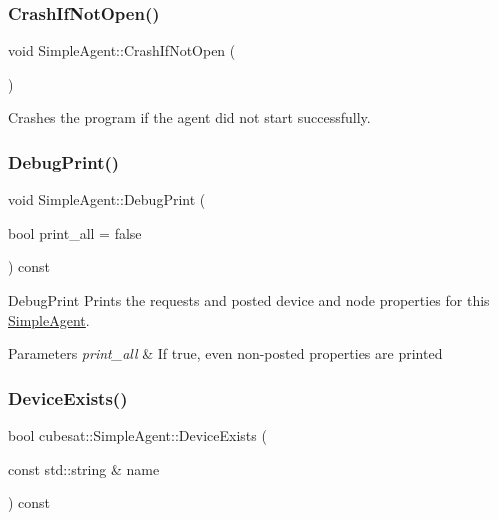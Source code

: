 \subsubsection{\texorpdfstring{Crash\+If\+Not\+Open()}{CrashIfNotOpen()}}
{\footnotesize\ttfamily void Simple\+Agent\+::\+Crash\+If\+Not\+Open (\begin{DoxyParamCaption}{ }\end{DoxyParamCaption})}



Crashes the program if the agent did not start successfully. 

\mbox{\label{classcubesat_1_1SimpleAgent_af5c2133bcbb45de986a69343c13ed513}} 
\subsubsection{\texorpdfstring{Debug\+Print()}{DebugPrint()}}
{\footnotesize\ttfamily void Simple\+Agent\+::\+Debug\+Print (\begin{DoxyParamCaption}\item[{bool}]{print\+\_\+all = {\ttfamily false} }\end{DoxyParamCaption}) const}



Debug\+Print Prints the requests and posted device and node properties for this \hyperlink{classcubesat_1_1SimpleAgent}{Simple\+Agent}. 


\begin{DoxyParams}{Parameters}
{\em print\+\_\+all} & If true, even non-\/posted properties are printed \\
\hline
\end{DoxyParams}
\mbox{\label{classcubesat_1_1SimpleAgent_ae542ebdf5093584a4172a6576cc0972d}} 
\subsubsection{\texorpdfstring{Device\+Exists()}{DeviceExists()}}
{\footnotesize\ttfamily bool cubesat\+::\+Simple\+Agent\+::\+Device\+Exists (\begin{DoxyParamCaption}\item[{const std\+::string \&}]{name }\end{DoxyParamCaption}) const\hspace{0.3cm}{\ttfamily [inline]}}



